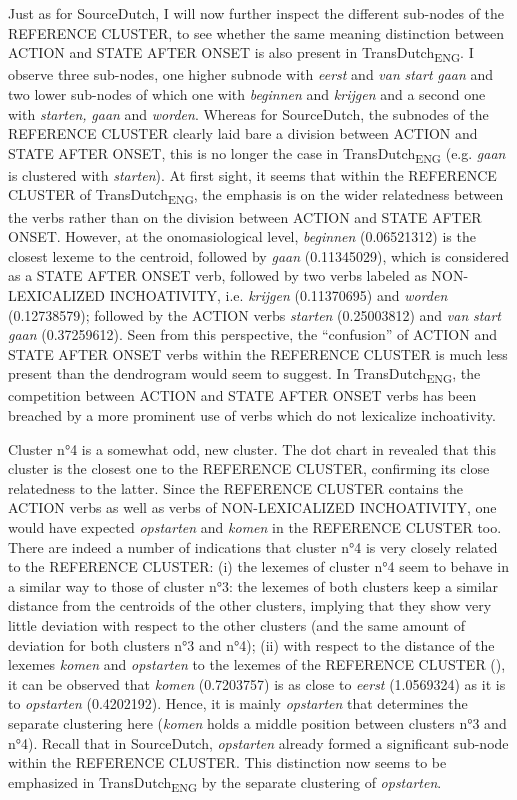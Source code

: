 Just as for SourceDutch, I will now further inspect the different sub-nodes of the REFERENCE CLUSTER, to see whether the same meaning distinction between ACTION and STATE AFTER ONSET is also present in TransDutch\textsubscript{ENG}. I observe three sub-nodes, one higher subnode with \textit{eerst} and \textit{van} \textit{start} \textit{gaan} and two lower sub-nodes of which one with \textit{beginnen} and \textit{krijgen} and a second one with \textit{starten,} \textit{gaan} and \textit{worden}. Whereas for SourceDutch, the subnodes of the REFERENCE CLUSTER clearly laid bare a division between ACTION and STATE AFTER ONSET, this is no longer the case in TransDutch\textsubscript{ENG} (e.g. \textit{gaan} is clustered with \textit{starten}). At first sight, it seems that within the REFERENCE CLUSTER of TransDutch\textsubscript{ENG}, the emphasis is on the wider relatedness between the verbs rather than on the division between ACTION and STATE AFTER ONSET. However, at the onomasiological level, \textit{beginnen} (0.06521312) is the closest lexeme to the centroid, followed by \textit{gaan} (0.11345029), which is considered as a STATE AFTER ONSET verb, followed by two verbs labeled as {NON-LEXICALIZED INCHOATIVITY}, i.e. \textit{krijgen} (0.11370695) and \textit{worden} (0.12738579); followed by the ACTION verbs \textit{starten} (0.25003812) and \textit{van} \textit{start} \textit{gaan} (0.37259612). Seen from this perspective, the ``confusion'' of ACTION and STATE AFTER ONSET verbs within the REFERENCE CLUSTER is much less present than the dendrogram would seem to suggest. In TransDutch\textsubscript{ENG}, the competition between ACTION and STATE AFTER ONSET verbs has been breached by a more prominent use of verbs which do not lexicalize inchoativity.

Cluster n°4 is a somewhat odd, new cluster. The dot chart in  revealed that this cluster is the closest one to the REFERENCE CLUSTER, confirming its close relatedness to the latter. Since the REFERENCE CLUSTER contains the ACTION verbs as well as verbs of {NON-LEXICALIZED INCHOATIVITY}, one would have expected \textit{opstarten} and \textit{komen} in the REFERENCE CLUSTER too. There are indeed a number of indications that cluster n°4 is very closely related to the REFERENCE CLUSTER: (i) the lexemes of cluster n°4 seem to behave in a similar way to those of cluster n°3: the lexemes of both clusters keep a similar distance from the centroids of the other clusters, implying that they show very little deviation with respect to the other clusters (and the same amount of deviation for both clusters n°3 and n°4); (ii) with respect to the distance of the lexemes \textit{komen} and \textit{opstarten} to the lexemes of the REFERENCE CLUSTER (), it can be observed that \textit{komen} (0.7203757) is as close to \textit{eerst} (1.0569324) as it is to \textit{opstarten} (0.4202192). Hence, it is mainly \textit{opstarten} that determines the separate clustering here (\textit{komen} holds a middle position between clusters n°3 and n°4). Recall that in SourceDutch, \textit{opstarten} already formed a significant sub-node within the REFERENCE CLUSTER. This distinction now seems to be emphasized in TransDutch\textsubscript{ENG} by the separate clustering of \textit{opstarten}.


